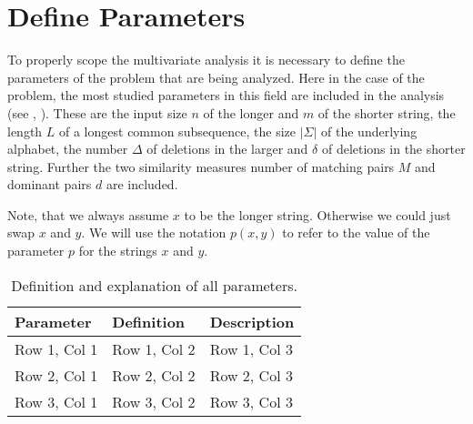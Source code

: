 \section{Define Parameters}
\label{sec:def-params}
To properly scope the multivariate analysis it is necessary to define the parameters of the problem that are being analyzed.
Here in the case of the \lcs{} problem, the most studied parameters in this field are included in the analysis (see \cite{Bergroth.2000}, \cite{Paterson.1994}). 
These are the input size $n$ of the longer and $m$ of the shorter string, 
the length $L$ of a longest common subsequence,
the size $|\Sigma|$ of the underlying alphabet,
the number $\Delta$ of deletions in the larger and $\delta$ of deletions in the shorter string.
Further the two similarity measures number of matching pairs $M$ and dominant pairs $d$ are included.



Note, that we always assume $x$ to be the longer string. Otherwise we could just swap $x$ and $y$.
We will use the notation $p(x,y)$ to refer to the value of the parameter $p$ for the strings $x$ and $y$.


\begin{table}[ht]
\centering
\begin{tabular}{lll}
\toprule
\textbf{Parameter} & \textbf{Definition} & \textbf{Description} \\
\midrule
Row 1, Col 1 & Row 1, Col 2 & Row 1, Col 3 \\
Row 2, Col 1 & Row 2, Col 2 & Row 2, Col 3 \\
Row 3, Col 1 & Row 3, Col 2 & Row 3, Col 3 \\
\bottomrule
\end{tabular}
\caption{Definition and explanation of all parameters.}
\end{table}
